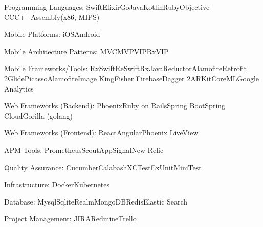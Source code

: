 \documentclass[10pt,a4paper]{article} %
\begin{document}


\inlineheadsection %
{Programming Languages:}
{Swift\bull Elixir\bull Go\bull Java\bull Kotlin\bull Ruby\bull Objective-C\bull C\bull C++\bull Assembly(x86, MIPS)}

\inlineheadsection %
{Mobile Platforms:}
{iOS\bull Android}

\inlineheadsection %
{Mobile Architecture Patterns:}
{MVC\bull MVP\bull VIP\bull RxVIP}

\inlineheadsection %
{Mobile Frameworks/Tools:}
{RxSwift\bull ReSwift\bull RxJava\bull Reductor\bull Alamofire\bull Retrofit 2\bull Glide\bull Picasso\bull AlamofireImage \bull KingFisher
\bull Firebase\bull Dagger 2\bull ARKit\bull CoreML\bull Google Analytics}

\inlineheadsection %
{Web Frameworks (Backend):}
{Phoenix\bull Ruby on Rails\bull Spring Boot\bull Spring Cloud\bull Gorilla (golang)}

\inlineheadsection %
{Web Frameworks (Frontend):}
{React\bull Angular\bull Phoenix LiveView}

\inlineheadsection %
{APM Tools:}
{Prometheus\bull Scout\bull AppSignal\bull New Relic}

\inlineheadsection %
{Quality Assurance:}
{Cucumber\bull Calabash\bull XCTest\bull ExUnit\bull MiniTest}

\inlineheadsection %
{Infrastructure:}
{Docker\bull Kubernetes}

\inlineheadsection %
{Database:}
{Mysql\bull Sqlite\bull Realm\bull MongoDB\bull Redis\bull Elastic Search}

\inlineheadsection %
{Project Management:}
{JIRA\bull Redmine\bull Trello}
\end{document}
